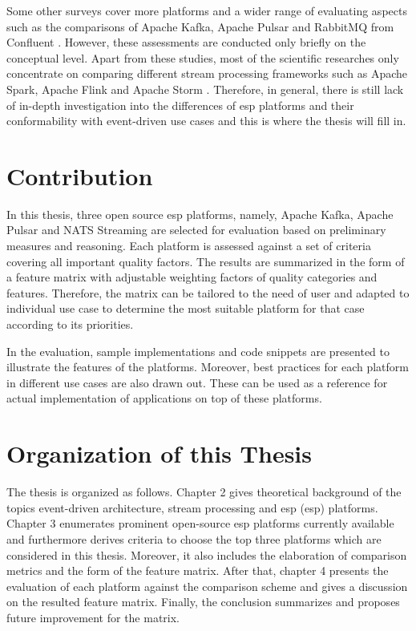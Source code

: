 Some other surveys cover more platforms and a wider range of evaluating aspects such as the comparisons of Apache Kafka, Apache Pulsar and RabbitMQ from Confluent \cite{overallcomparekafka} \cite{benchmarkkafkapulsarrabbitmq}. However, these assessments are conducted only briefly on the conceptual level. Apart from these studies, most of the scientific researches only concentrate on comparing different stream processing frameworks such as Apache Spark, Apache Flink and Apache Storm \cite{karimov2018benchmarking} \cite{isah2019survey} \cite{lopez2016performance}. Therefore, in general, there is still lack of in-depth investigation into the differences of \acrlong{esp} platforms and their conformability with event-driven use cases and this is where the thesis will fill in.
 
\section{Contribution}
In this thesis, three open source \acrlong{esp} platforms, namely, Apache Kafka, Apache Pulsar and NATS Streaming are selected for evaluation based on preliminary measures and reasoning. Each platform is assessed against a set of criteria covering all important quality factors. The results are summarized in the form of a feature matrix with adjustable weighting factors of quality categories and features. Therefore, the matrix can be tailored to the need of user and adapted to individual use case to determine the most suitable platform for that case according to its priorities.

In the evaluation, sample implementations and code snippets are presented to illustrate the features of the platforms. Moreover, best practices for each platform in different use cases are also drawn out. These can be used as a reference for actual implementation of applications on top of these platforms.

\section{Organization of this Thesis}
The thesis is organized as follows. Chapter 2 gives theoretical background of the topics event-driven architecture, stream processing and \acrlong{esp} (\acrshort{esp}) platforms. Chapter 3 enumerates prominent open-source \acrshort{esp} platforms currently available and furthermore derives criteria to choose the top three platforms which are considered in this thesis. Moreover, it also includes the elaboration of comparison metrics and the form of the feature matrix. After that, chapter 4 presents the evaluation of each platform against the comparison scheme and gives a discussion on the resulted feature matrix. Finally, the conclusion summarizes and proposes future improvement for the matrix.


